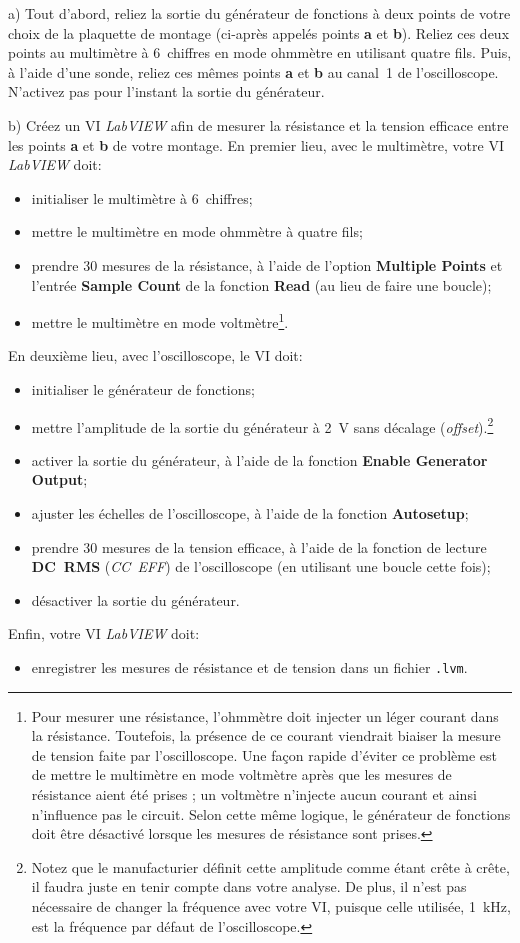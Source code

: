 \documentclass[canadien,12pt,oneside,letterpaper]{article}
\begin{document}
a) Tout d'abord, reliez la sortie du générateur de fonctions à deux points de votre choix de la plaquette de montage (ci-après appelés points \textbf{a} et \textbf{b}). Reliez ces deux points au multimètre à 6\textonehalf~chiffres en mode ohmmètre en utilisant quatre fils. Puis, à l'aide d'une sonde, reliez ces mêmes points \textbf{a} et \textbf{b} au canal~1 de l'oscilloscope. N'activez pas pour l'instant la sortie du générateur.

b) Créez un VI \textit{LabVIEW} afin de mesurer la résistance et la tension efficace entre les points \textbf{a} et \textbf{b} de votre montage. En premier lieu, avec le multimètre, votre VI \textit{LabVIEW} doit:
\begin{itemize}
\item initialiser le multimètre à 6\textonehalf~chiffres;
\item mettre le multimètre en mode ohmmètre à quatre fils;
\item prendre 30 mesures de la résistance, à l'aide de l'option \textbf{Multiple Points} et l'entrée \textbf{Sample Count} de la fonction \textbf{Read} (au lieu de faire une boucle);
\item mettre le multimètre en mode voltmètre\footnote{Pour mesurer une résistance, l'ohmmètre doit injecter un léger courant dans la résistance. Toutefois, la présence de ce courant viendrait biaiser la mesure de tension faite par l'oscilloscope. Une façon rapide d'éviter ce problème est de mettre le multimètre en mode voltmètre après que les mesures de résistance aient été prises ; un voltmètre n'injecte aucun courant et ainsi n'influence pas le circuit. Selon cette même logique, le générateur de fonctions doit être désactivé lorsque les mesures de résistance sont prises.}.
\end{itemize}
En deuxième lieu, avec l'oscilloscope, le VI doit:
\begin{itemize}
\item initialiser le générateur de fonctions;
\item mettre l'amplitude de la sortie du générateur à 2~V sans décalage (\textit{offset}).\footnote{Notez que le manufacturier définit cette amplitude comme étant crête à crête, il faudra juste en tenir compte dans votre analyse. De plus, il n'est pas nécessaire de changer la fréquence avec votre VI, puisque celle utilisée, 1~kHz, est la fréquence par défaut de l'oscilloscope.}
\item activer la sortie du générateur, à l'aide de la fonction \textbf{Enable Generator Output};
\item ajuster les échelles de l'oscilloscope, à l'aide de la fonction \textbf{Autosetup};
\item prendre 30 mesures de la tension efficace, à l'aide de la fonction de lecture \textbf{DC~RMS} (\textit{CC~EFF}) de l'oscilloscope (en utilisant une boucle cette fois);
\item désactiver la sortie du générateur.
\end{itemize}
Enfin, votre VI \textit{LabVIEW} doit:
\begin{itemize}
\item enregistrer les mesures de résistance et de tension dans un fichier \texttt{.lvm}.
\end{itemize}
\end{document}
